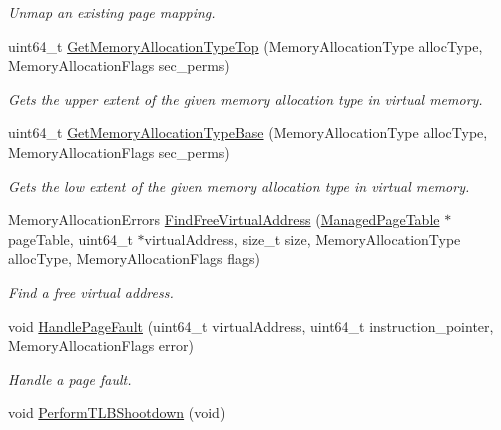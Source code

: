 \begin{DoxyCompactItemize}
\begin{DoxyCompactList}\small\item\em Unmap an existing page mapping. \end{DoxyCompactList}\item 
uint64\+\_\+t \hyperlink{group__memory__hal_gac722f82a0df4747180f3c7b113b3e936}{Get\+Memory\+Allocation\+Type\+Top} (Memory\+Allocation\+Type alloc\+Type, Memory\+Allocation\+Flags sec\+\_\+perms)
\begin{DoxyCompactList}\small\item\em Gets the upper extent of the given memory allocation type in virtual memory. \end{DoxyCompactList}\item 
uint64\+\_\+t \hyperlink{group__memory__hal_ga3ac119747e32d0a3d91c6a97d9e25c09}{Get\+Memory\+Allocation\+Type\+Base} (Memory\+Allocation\+Type alloc\+Type, Memory\+Allocation\+Flags sec\+\_\+perms)
\begin{DoxyCompactList}\small\item\em Gets the low extent of the given memory allocation type in virtual memory. \end{DoxyCompactList}\item 
Memory\+Allocation\+Errors \hyperlink{group__memory__hal_ga056bb78e5beccb23ea293fe43962393b}{Find\+Free\+Virtual\+Address} (\hyperlink{structManagedPageTable}{Managed\+Page\+Table} $\ast$page\+Table, uint64\+\_\+t $\ast$virtual\+Address, size\+\_\+t size, Memory\+Allocation\+Type alloc\+Type, Memory\+Allocation\+Flags flags)
\begin{DoxyCompactList}\small\item\em Find a free virtual address. \end{DoxyCompactList}\item 
void \hyperlink{group__memory__hal_ga86c40810b55a13e73f8d19a1eb8891e8}{Handle\+Page\+Fault} (uint64\+\_\+t virtual\+Address, uint64\+\_\+t instruction\+\_\+pointer, Memory\+Allocation\+Flags error)
\begin{DoxyCompactList}\small\item\em Handle a page fault. \end{DoxyCompactList}\item 
void \hyperlink{group__memory__hal_ga05983f77acff6cdb4ae5bc697fda128c}{Perform\+T\+L\+B\+Shootdown} (void)\hypertarget{group__memory__hal_ga05983f77acff6cdb4ae5bc697fda128c}{}\label{group__memory__hal_ga05983f77acff6cdb4ae5bc697fda128c}


\end{DoxyCompactItemize}
